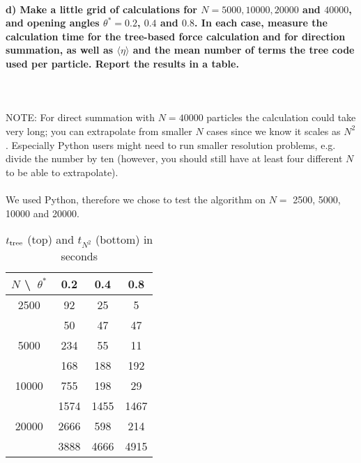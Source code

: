 \newpage
\paragraph{d) Make a little grid of calculations for 
    $N=5000, 10000, 20000$ and $40000$, and opening angles 
    $\theta^*=0.2$, $0.4$ and $0.8$. In each case, measure the 
    calculation time for the tree-based force calculation and 
    for direction summation, as well as $\langle\eta\rangle$ 
    and the mean number of terms the tree code used per particle. 
    Report the results in a table.
} \ \\
    \\
    NOTE: For direct summation with $N=40000$ particles the 
    calculation could take very long; you can extrapolate from 
    smaller $N$ cases since we know it scales as $N^2$.
    Especially Python users might need to run smaller resolution 
    problems, e.g. divide the number by ten (however, you should 
    still have at least four different $N$ to be able to 
    extrapolate). \\
    \\
    We used Python, therefore we chose to test the algorithm on 
    $N=$ 2500, 5000, 10000 and 20000.
    \begin{table}[h!]
        \begin{center}
        \caption{$t_\textnormal{tree}$ (top) and $t_{N^2}$ (bottom) in seconds}
        \begin{tabular}{c | c | c | c}
            $N$ \textbackslash\ $\theta^*$ & 0.2  & 0.4  & 0.8 \\
            \hline
            2500   & 92   & 25   & 5    \\
                   & 50   & 47   & 47   \\
            \hline
            5000   & 234  & 55   & 11   \\
                   & 168  & 188  & 192  \\
            \hline
            10000  & 755  & 198  & 29   \\
                   & 1574 & 1455 & 1467 \\
            \hline
            20000  & 2666 & 598  & 214  \\
                   & 3888 & 4666 & 4915 \\
        \end{tabular}
        \end{center}
    \end{table} 
